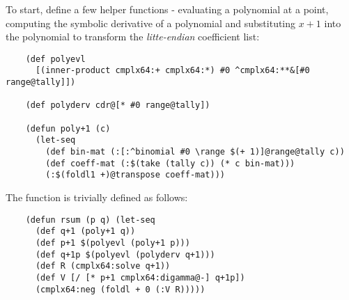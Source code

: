 To start, define a few helper functions - evaluating a polynomial at a point, computing the symbolic derivative of a polynomial and substituting $x+1$ into the polynomial to transform the \textit{litte-endian} coefficient list:

\begin{Verbatim}
    (def polyevl
      [(inner-product cmplx64:+ cmplx64:*) #0 ^cmplx64:**&[#0 range@tally]])

    (def polyderv cdr@[* #0 range@tally])

    (defun poly+1 (c)
      (let-seq
        (def bin-mat (:[:^binomial #0 \range $(+ 1)]@range@tally c))
        (def coeff-mat (:$(take (tally c)) (* c bin-mat)))
        (:$(foldl1 +)@transpose coeff-mat)))
\end{Verbatim}

The function is trivially defined as follows:

\begin{Verbatim}
    (defun rsum (p q) (let-seq
      (def q+1 (poly+1 q))
      (def p+1 $(polyevl (poly+1 p)))
      (def q+1p $(polyevl (polyderv q+1)))
      (def R (cmplx64:solve q+1))
      (def V [/ [* p+1 cmplx64:digamma@-] q+1p])
      (cmplx64:neg (foldl + 0 (:V R)))))
\end{Verbatim}

